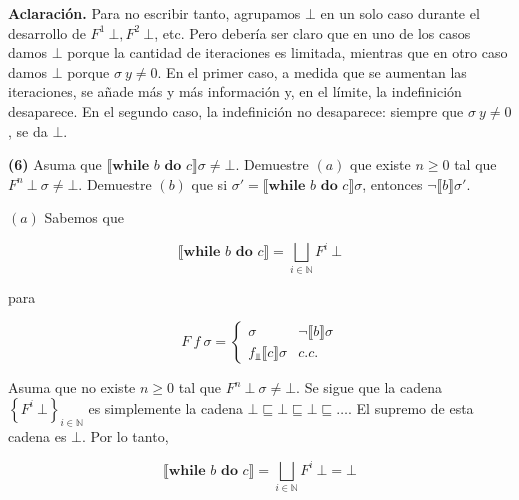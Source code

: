 \documentclass[article, 12pt]{article}
\begin{document}
\footnotesize
\begin{helpframe}
  \textbf{Aclaración.} Para no escribir tanto, agrupamos $\bot $ en un solo caso
  durante el desarrollo de $F^1 ~ \bot , F^2 ~ \bot $, etc. Pero debería ser
  claro que en uno de los casos damos $\bot $ porque la cantidad de iteraciones
  es limitada, mientras que en otro caso damos $\bot $ porque $\sigma ~ y \neq 0$. En el
  primer caso, a medida que se aumentan las iteraciones, se añade más y más
  información y, en el límite, la indefinición desaparece. En el segundo caso,
  la indefinición no desaparece: siempre que $\sigma ~ y \neq 0$, se da $\bot $.
\end{helpframe}

\normalsize
\pagebreak 

\begin{myframe}
  \textbf{(6)} Asuma que $\llbracket \textbf{while } b \textbf{ do } c\rrbracket\sigma \neq
  \bot $. Demuestre $(a)$ que existe $n \geq 0$ tal que $F^n ~ \bot ~ \sigma
  \neq \bot $. Demuestre $(b)$ que si $\sigma' = \llbracket \textbf{while } b
  \textbf{ do } c\rrbracket\sigma$, entonces $\neg\llbracket b
  \rrbracket\sigma'$.
\end{myframe}

$(a)$ Sabemos que 

\begin{equation*}
  \llbracket \textbf{while } b \textbf{ do } c\rrbracket = \bigsqcup_{i \in
  \mathbb{N}} F^i ~ \bot 
\end{equation*}

para 

\begin{equation*}
  F ~ f ~ \sigma = \begin{cases}
    \sigma & \neg\llbracket b \rrbracket \sigma \\ 
    f_{\Bot}\llbracket c \rrbracket\sigma & c.c.
  \end{cases}
\end{equation*}

Asuma que no existe $n \geq 0$ tal que $F^n ~ \bot  ~ \sigma \neq \bot $. Se
sigue que la cadena $\left\{ F^i ~ \bot  \right\}_{i \in \mathbb{N}} $ es
simplemente la cadena $\bot  \sqsubseteq \bot \sqsubseteq \bot  \sqsubseteq
\ldots$. El supremo de esta cadena es $\bot $. Por lo tanto, 

\begin{equation*}
  \llbracket \textbf{while } b \textbf{ do } c\rrbracket = \bigsqcup_{i \in
  \mathbb{N}} F^i ~ \bot = \bot 
\end{equation*}
\end{document}
